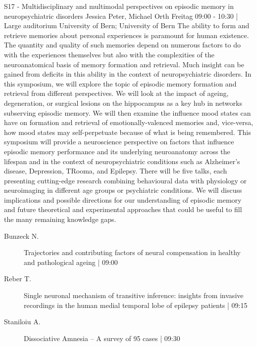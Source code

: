 
            \begin{symposium}
            {S17 - Multidisciplinary and multimodal perspectives on episodic memory in neuropsychiatric disorders}
            {Jessica Peter, Michael Orth }
            {Freitag 09:00 - 10:30 | Large auditorium}
            {University of Bern; University of Bern}
            The ability to form and retrieve memories about personal experiences is paramount for human existence. The quantity and quality of such memories depend on numerous factors to do with the experiences themselves but also with the complexities of the neuroanatomical basis of memory formation and retrieval. Much insight can be gained from deficits in this ability in the context of neuropsychiatric disorders. In this symposium, we will explore the topic of episodic memory formation and retrieval from different perspectives. We will look at the impact of ageing, degeneration, or surgical lesions on the hippocampus as a key hub in networks subserving episodic memory. We will then examine the influence mood states can have on formation and retrieval of emotionally-valenced memories and, vice-versa, how mood states may self-perpetuate because of what is being remembered.
This symposium will provide a neuroscience perspective on factors that influence episodic memory performance and its underlying neuroanatomy across the lifespan and in the context of neuropsychiatric conditions such as Alzheimer’s disease, Depression, TRooma, and Epilepsy. There will be five talks, each presenting cutting-edge research combining behavioural data with physiology or neuroimaging in different age groups or psychiatric conditions. We will discuss implications and possible directions for our understanding of episodic memory and future theoretical and experimental approaches that could be useful to fill the many remaining knowledge gaps.
            \begin{description}    
            
                \item [ Bunzeck N.] Trajectories and contributing factors of neural compensation in healthy and pathological ageing \textcolor{mygray}{ | 09:00}    
                
                \item [ Reber T.] Single neuronal mechanism of transitive inference: insights from invasive recordings in the human medial temporal lobe of epilepsy patients \textcolor{mygray}{ | 09:15}    
                
                \item [ Staniloiu A.] Dissociative Amnesia – A survey of 95 cases \textcolor{mygray}{ | 09:30}    
                

\end{description}
\end{symposium}
